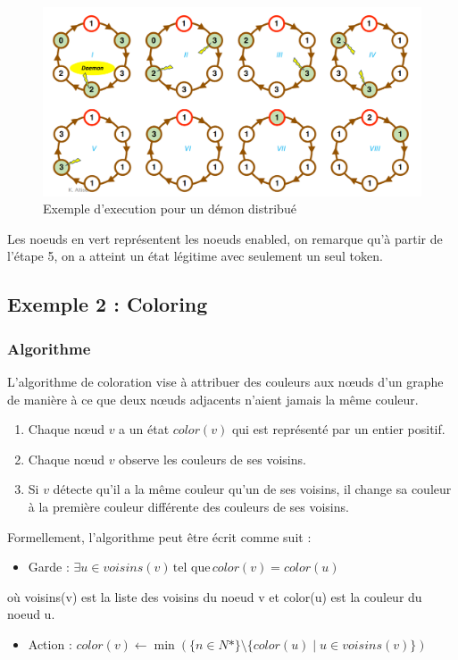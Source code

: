 \documentclass[11pt]{article}
\begin{document}
\begin{figure}[h]
    \centering
    \includegraphics[width=\textwidth]{figs/exec_distribue.png}
    \caption{Exemple d'execution pour un démon distribué}
    \label{fig:ex_disjkstra}
\end{figure}

Les noeuds en vert représentent les noeuds enabled, on remarque qu'à partir de l'étape 5, on a atteint un état légitime avec seulement un seul token.

\subsection{Exemple 2 : Coloring}
\label{sec:org45a4c91}

\subsubsection{Algorithme}
\label{sec:org12a1bd1}
L'algorithme de coloration vise à attribuer des couleurs aux nœuds d'un graphe de manière à ce que deux nœuds adjacents n'aient jamais la même couleur. 

\begin{enumerate}
\item Chaque nœud \(v\) a un état  \(color(v)\) qui est représenté par un entier positif.
\item Chaque nœud \(v\) observe les couleurs de ses voisins.
\item Si \(v\) détecte qu'il a la même couleur qu'un de ses voisins, il change sa couleur à la première couleur différente des couleurs de ses voisins.
\end{enumerate}

Formellement, l'algorithme peut être écrit comme suit :
\begin{itemize}
\item Garde : \(\exists u \in voisins(v) \, \text{tel que} \, color(v) = color(u)\)
\end{itemize}
où voisins(v) est la liste des voisins du noeud v et color(u) est la couleur du noeud u.
\begin{itemize}
\item Action : \(color(v) \leftarrow \min(\{n \in N* \} \setminus \{color(u) \mid u \in voisins(v)\})\)
\end{itemize}
\end{document}
